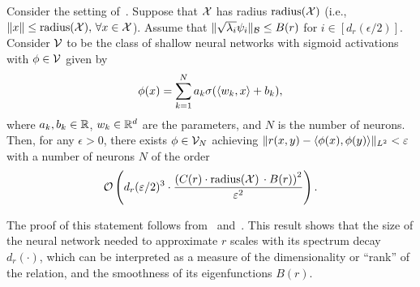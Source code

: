 \begin{corollary}\label{cor:sym_iprod_kernel_barron_neuron_bound}
	Consider the setting of~. Suppose that ${\mathcal{X}}$ has radius $\mathrm{radius}({\mathcal{X}})$ (i.e., $\lVert x\rVert \leq \mathrm{radius}({\mathcal{X}}),\, \forall x \in {\mathcal{X}}$). Assume that $\lVert\sqrt{\lambda_i} \psi_i\rVert_{{\mathcal{B}}} \leq B(r)$ for $i \in [d_r(\epsilon/2)]$. Consider ${\mathcal{V}}$ to be the class of shallow neural networks with sigmoid activations with $\phi \in {\mathcal{V}}$ given by
	\begin{equation*}
		\phi(x) = \sum_{k=1}^{N} a_k \sigma(\left \langle w_k, x \right\rangle + b_k),
	\end{equation*}
	where $a_k, b_k \in \mathbb{R}$, $w_k \in \mathbb{R}^{d}$ are the parameters, and $N$ is the number of neurons. Then, for any $\epsilon > 0$, there exists $\phi \in {\mathcal{V}}_N$ achieving $\lVert r(x,y) - \left \langle \phi(x), \phi(y) \right\rangle\rVert_{L^2} < \varepsilon$ with a number of neurons $N$ of the order
	\[{\mathcal{O}}\left(d_r(\varepsilon / 2)^3 \cdot \frac{\left(C(r) \cdot \mathrm{radius}({\mathcal{X}})\, \cdot B(r)\right)^2}{\varepsilon^2}\right).\]
\end{corollary}
The proof of this statement follows from~ and~\textcite{barronUniversalApproximation1993}. 
This result shows that the size of the neural network needed to approximate $r$ scales with its spectrum decay $d_r(\cdot)$, which can be interpreted as a measure of the dimensionality or ``rank'' of the relation, and the smoothness of its eigenfunctions $B(r)$.
